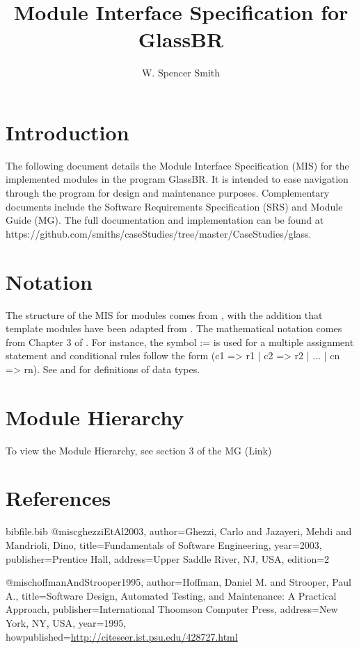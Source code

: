 \documentclass[12pt]{article}
\title{Module Interface Specification for GlassBR}
\author{W. Spencer Smith}
\begin{document}
\maketitle
\tableofcontents
\newpage
\section{Introduction}
\label{Sec:Intro}
The following document details the Module Interface Specification (MIS) for the implemented modules in the program GlassBR. It is intended to ease navigation through the program for design and maintenance purposes. Complementary documents include the Software Requirements Specification (SRS) and Module Guide (MG). The full documentation and implementation can be found at https://github.com/smiths/caseStudies/tree/master/CaseStudies/glass.
\section{Notation}
\label{Sec:Notation}
The structure of the MIS for modules comes from \cite{hoffmanAndStrooper1995}, with the addition that template modules have been adapted from \cite{ghezziEtAl2003}. The mathematical notation comes from Chapter 3 of \cite{hoffmanAndStrooper1995}. For instance, the symbol := is used for a multiple assignment statement and conditional rules follow the form (c1 => r1 | c2 => r2 | ... | cn => rn). See \cite{ghezziEtAl2003} and \cite{hoffmanAndStrooper1995} for definitions of data types.
\section{Module Hierarchy}
\label{Sec:ModHierarchy}
To view the Module Hierarchy, see section 3 of the MG (Link)
\section{References}
\label{Sec:References}
\begin{filecontents*}{bibfile.bib}
@misc{ghezziEtAl2003,
author={Ghezzi, Carlo and Jazayeri, Mehdi and Mandrioli, Dino},
title={Fundamentals of Software Engineering},
year={2003},
publisher={Prentice Hall},
address={Upper Saddle River, NJ, USA},
edition={2}}

@misc{hoffmanAndStrooper1995,
author={Hoffman, Daniel M. and Strooper, Paul A.},
title={Software Design, Automated Testing, and Maintenance: A Practical Approach},
publisher={International Thoomson Computer Press},
address={New York, NY, USA},
year={1995},
howpublished={\url{http://citeseer.ist.psu.edu/428727.html}}}
\end{filecontents*}
\nocite{*}
\printbibliography[heading=none]
\end{document}
